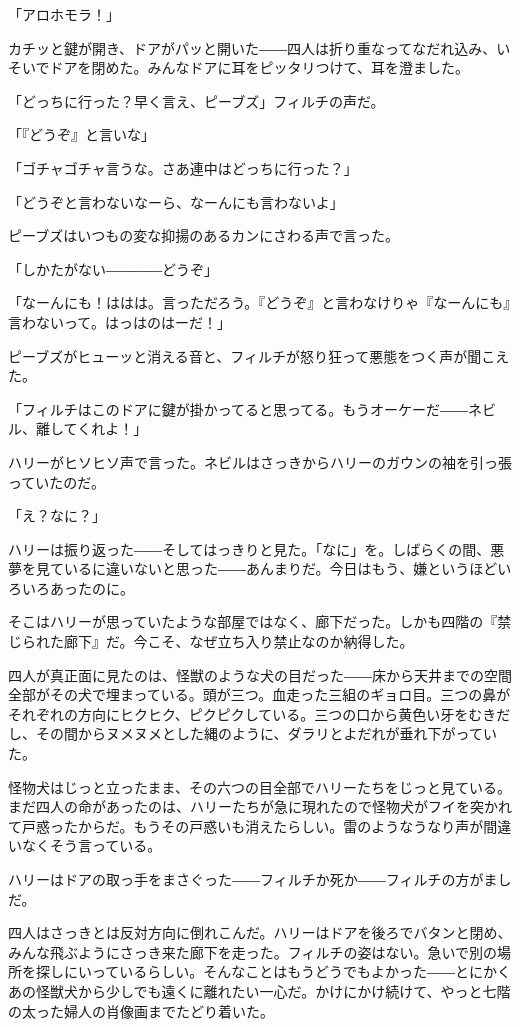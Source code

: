 \documentclass[10pt,a4paper]{article}
\begin{document}
\begin{CJK}{UTF8}{min}
「アロホモラ！」

カチッと鍵が開き、ドアがパッと開いた――四人は折り重なってなだれ込み、いそいでドアを閉めた。みんなドアに耳をピッタリつけて、耳を澄ました。

「どっちに行った？早く言え、ピーブズ」フィルチの声だ。

「『どうぞ』と言いな」

「ゴチャゴチャ言うな。さあ連中はどっちに行った？」

「どうぞと言わないなーら、なーんにも言わないよ」

ピーブズはいつもの変な抑揚のあるカンにさわる声で言った。

「しかたがない――――どうぞ」

「なーんにも！ははは。言っただろう。『どうぞ』と言わなけりゃ『なーんにも』言わないって。はっはのはーだ！」

ピーブズがヒューッと消える音と、フィルチが怒り狂って悪態をつく声が聞こえた。

「フィルチはこのドアに鍵が掛かってると思ってる。もうオーケーだ――ネビル、離してくれよ！」

ハリーがヒソヒソ声で言った。ネビルはさっきからハリーのガウンの袖を引っ張っていたのだ。

「え？なに？」

ハリーは振り返った――そしてはっきりと見た。「なに」を。しばらくの間、悪夢を見ているに違いないと思った――あんまりだ。今日はもう、嫌というほどいろいろあったのに。

そこはハリーが思っていたような部屋ではなく、廊下だった。しかも四階の『禁じられた廊下』だ。今こそ、なぜ立ち入り禁止なのか納得した。

四人が真正面に見たのは、怪獣のような犬の目だった――床から天井までの空間全部がその犬で埋まっている。頭が三つ。血走った三組のギョロ目。三つの鼻がそれぞれの方向にヒクヒク、ピクピクしている。三つの口から黄色い牙をむきだし、その間からヌメヌメとした縄のように、ダラリとよだれが垂れ下がっていた。

怪物犬はじっと立ったまま、その六つの目全部でハリーたちをじっと見ている。まだ四人の命があったのは、ハリーたちが急に現れたので怪物犬がフイを突かれて戸惑ったからだ。もうその戸惑いも消えたらしい。雷のようなうなり声が間違いなくそう言っている。

ハリーはドアの取っ手をまさぐった――フィルチか死か――フィルチの方がましだ。

四人はさっきとは反対方向に倒れこんだ。ハリーはドアを後ろでバタンと閉め、みんな飛ぶようにさっき来た廊下を走った。フィルチの姿はない。急いで別の場所を探しにいっているらしい。そんなことはもうどうでもよかった――とにかくあの怪獣犬から少しでも遠くに離れたい一心だ。かけにかけ続けて、やっと七階の太った婦人の肖像画までたどり着いた。


\end{CJK}
\end{document}
